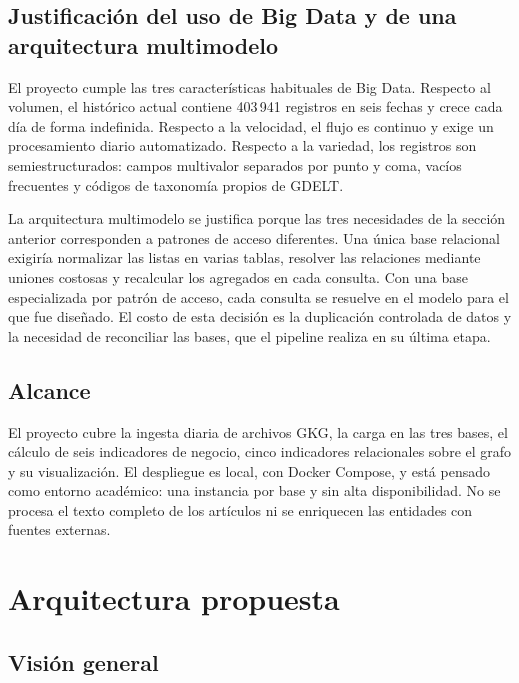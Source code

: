 \documentclass[11pt,a4paper]{article}
\begin{document}
\subsection{Justificación del uso de Big Data y de una arquitectura multimodelo}

El proyecto cumple las tres características habituales de Big Data. Respecto al volumen, el histórico actual contiene 403\,941 registros en seis fechas y crece cada día de forma indefinida. Respecto a la velocidad, el flujo es continuo y exige un procesamiento diario automatizado. Respecto a la variedad, los registros son semiestructurados: campos multivalor separados por punto y coma, vacíos frecuentes y códigos de taxonomía propios de GDELT.

La arquitectura multimodelo se justifica porque las tres necesidades de la sección anterior corresponden a patrones de acceso diferentes. Una única base relacional exigiría normalizar las listas en varias tablas, resolver las relaciones mediante uniones costosas y recalcular los agregados en cada consulta. Con una base especializada por patrón de acceso, cada consulta se resuelve en el modelo para el que fue diseñado. El costo de esta decisión es la duplicación controlada de datos y la necesidad de reconciliar las bases, que el pipeline realiza en su última etapa.

\subsection{Alcance}

El proyecto cubre la ingesta diaria de archivos GKG, la carga en las tres bases, el cálculo de seis indicadores de negocio, cinco indicadores relacionales sobre el grafo y su visualización. El despliegue es local, con Docker Compose, y está pensado como entorno académico: una instancia por base y sin alta disponibilidad. No se procesa el texto completo de los artículos ni se enriquecen las entidades con fuentes externas.

\section{Arquitectura propuesta}\label{sec:arquitectura}

\subsection{Visión general}
\end{document}
